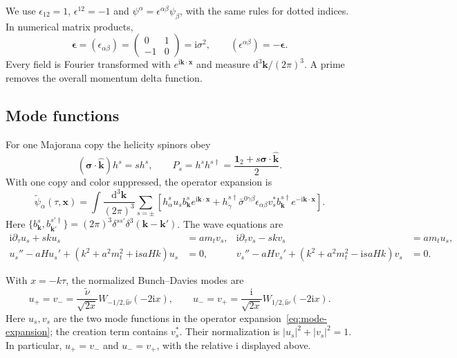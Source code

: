 \documentclass[a4paper,12pt]{article}
\newcommand{\ii}{\mathrm i}
\newcommand{\mb}{\mathbf}
\newcommand{\tn}{\tilde\nu}
\newcommand{\di}{\mathrm d}
\newcommand{\bk}{\mb k}
\newcommand{\bs}{\bm\sigma}
\newcommand{\one}{\mathbf1_2}
\newcommand{\epsmat}{\boldsymbol{\epsilon}}
\begin{document}
We use $\epsilon_{12}=1$, $\epsilon^{12}=-1$ and
$\psi^\alpha=\epsilon^{\alpha\beta}\psi_\beta$, with the same rules
for dotted indices. In numerical matrix products,
\begin{equation}
 \epsmat=(\epsilon_{\alpha\beta})=
 \begin{pmatrix}0&1\\-1&0\end{pmatrix}=\ii\sigma^2,
 \qquad (\epsilon^{\alpha\beta})=-\epsmat.
\end{equation}
Every field is Fourier transformed with $e^{\ii\bk\cdot\mb x}$ and
measure $\di^3\bk/(2\pi)^3$. A prime removes the overall momentum delta
function.

\subsection{Mode functions}
For one Majorana copy the helicity spinors obey
\begin{equation}
 (\bs\cdot\widehat{\bk})h^s=s h^s,\qquad
 P_s=h^s h^{s\dagger}
 =\frac{\one+s\bs\cdot\widehat{\bk}}{2}.
\end{equation}
With one copy
and color suppressed, the operator expansion is
\begin{equation}
 \widetilde\psi_\alpha(\tau,\mb x)=\int\frac{\di^3\bk}{(2\pi)^3}
 \sum_{s=\pm}\left[
 h^s_\alpha u_s b^s_{\bk}e^{\ii\bk\cdot\mb x}
 +h^{s\dagger}_{\dot\gamma}\bar\sigma^{0\dot\gamma\beta}\epsilon_{\alpha\beta} v_s^*b^{s\dagger}_{\bk}
 e^{-\ii\bk\cdot\mb x}\right].
 \label{eq:mode-expansion}
\end{equation}
Here $\{b^s_{\bk},b^{s'\dagger}_{\bk'}\}
=(2\pi)^3\delta^{ss'}\delta^3(\bk-\bk')$.
The wave equations are
\begin{align}
 \ii\partial_\tau u_s+s ku_s&=am_tv_s,&
 \ii\partial_\tau v_s-s kv_s&=am_tu_s,\label{eq:weyl-eom}\\
 u_s''-aHu_s'+(k^2+a^2m_t^2+\ii s aHk)u_s&=0,&
 v_s''-aHv_s'+(k^2+a^2m_t^2-\ii s aHk)v_s&=0.
\end{align}

With $x=-k\tau$, the normalized Bunch--Davies modes are
\begin{equation}
 \boxed{u_+=v_- =\frac{\tn}{\sqrt{2x}}W_{-1/2,\ii\tn}(-2\ii x),\qquad
 u_-=v_+ =\frac{\ii}{\sqrt{2x}}W_{1/2,\ii\tn}(-2\ii x).}
 \label{eq:aoki-modes}
\end{equation}
Here $u_s,v_s$ are the two mode functions in the
operator expansion~\eqref{eq:mode-expansion}; the creation term contains
$v_s^*$. Their normalization is
$|u_s|^2+|v_s|^2=1$. In particular,
$u_+=v_-$ and $u_-=v_+$, with the relative $\ii$ displayed above.
\end{document}
